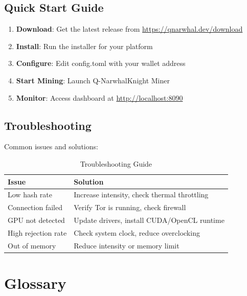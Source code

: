\documentclass[11pt,a4paper]{article}
\begin{document}
\subsection{Quick Start Guide}

\begin{enumerate}
    \item \textbf{Download}: Get the latest release from \url{https://qnarwhal.dev/download}
    \item \textbf{Install}: Run the installer for your platform
    \item \textbf{Configure}: Edit config.toml with your wallet address
    \item \textbf{Start Mining}: Launch Q-NarwhalKnight Miner
    \item \textbf{Monitor}: Access dashboard at \url{http://localhost:8090}
\end{enumerate}

\subsection{Troubleshooting}

Common issues and solutions:

\begin{table}[H]
\centering
\begin{tabular}{|p{5cm}|p{7cm}|}
\hline
\textbf{Issue} & \textbf{Solution} \\
\hline
Low hash rate & Increase intensity, check thermal throttling \\
Connection failed & Verify Tor is running, check firewall \\
GPU not detected & Update drivers, install CUDA/OpenCL runtime \\
High rejection rate & Check system clock, reduce overclocking \\
Out of memory & Reduce intensity or memory limit \\
\hline
\end{tabular}
\caption{Troubleshooting Guide}
\end{table}

\section{Glossary}
\end{document}
